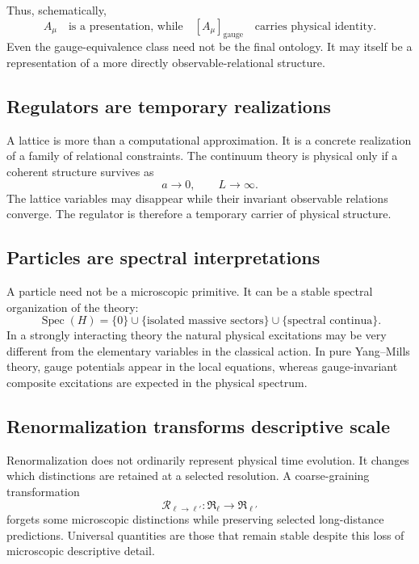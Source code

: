 \documentclass[11pt]{article}
\newcommand{\Spec}{\operatorname{Spec}}
\begin{document}
Thus, schematically,
\begin{equation}
  A_\mu
  \quad\text{is a presentation, while}\quad
  [A_\mu]_{\mathrm{gauge}}
  \quad\text{carries physical identity}.
  \label{eq:gauge-identity}
\end{equation}
Even the gauge-equivalence class need not be the final ontology.  It may itself
be a representation of a more directly observable-relational structure.

\subsection{Regulators are temporary realizations}

A lattice is more than a computational approximation.  It is a concrete
realization of a family of relational constraints.  The continuum theory is
physical only if a coherent structure survives as
\begin{equation}
  a\longrightarrow0,
  \qquad
  L\longrightarrow\infty.
\end{equation}
The lattice variables may disappear while their invariant observable relations
converge.  The regulator is therefore a temporary carrier of physical
structure.

\subsection{Particles are spectral interpretations}

A particle need not be a microscopic primitive.  It can be a stable spectral
organization of the theory:
\begin{equation}
  \Spec(H)
  =
  \{0\}
  \cup
  \{\text{isolated massive sectors}\}
  \cup
  \{\text{spectral continua}\}.
\end{equation}
In a strongly interacting theory the natural physical excitations may be very
different from the elementary variables in the classical action.  In pure
Yang--Mills theory, gauge potentials appear in the local equations, whereas
gauge-invariant composite excitations are expected in the physical spectrum.

\subsection{Renormalization transforms descriptive scale}

Renormalization does not ordinarily represent physical time evolution.  It
changes which distinctions are retained at a selected resolution.  A
coarse-graining transformation
\begin{equation}
  \mathcal R_{\ell\to\ell'}:
  \mathfrak R_\ell
  \longrightarrow
  \mathfrak R_{\ell'}
  \label{eq:coarse-graining}
\end{equation}
forgets some microscopic distinctions while preserving selected long-distance
predictions.  Universal quantities are those that remain stable despite this
loss of microscopic descriptive detail.
\end{document}
